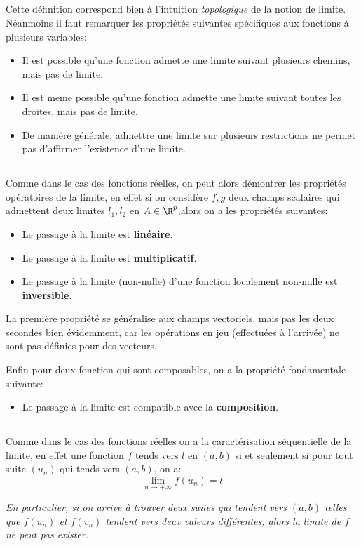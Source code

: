 \subsection*{}
Cette définition correspond bien à l'intuition \textit{topologique} de la notion de limite. Néanmoins il faut remarquer les propriétés suivantes spécifiques aux fonctions à plusieurs variables:
\begin{itemize}
   \item Il est possible qu'une fonction admette une limite suivant plusieurs chemins, mais pas de limite.
   \item Il est meme possible qu'une fonction admette une limite suivant toutes les droites, mais pas de limite.
   \item De manière générale, admettre une limite sur plusieurs restrictions ne permet pas d'affirmer l'existence d'une limite.
\end{itemize}

\subsection*{}
Comme dans le cas des fonctions réelles, on peut alors démontrer les propriétés opératoires de la limite, en effet si on considère \(f, g\) deux champs scalaires qui admettent deux limites \(l_1, l_2\) en \(A \in \R^p\),alors on a les propriétés suivantes:
\begin{itemize}
   \item Le passage à la limite est \textbf{linéaire}.
   \item Le passage à la limite est \textbf{multiplicatif}.
   \item Le passage à la limite (non-nulle) d'une fonction localement non-nulle est \textbf{inversible}.
\end{itemize}
La première propriété se généralise aux champs vectoriels, mais pas les deux secondes bien évidemment, car les opérations en jeu (effectuées à l'arrivée) ne sont pas définies pour des vecteurs.\<

Enfin pour deux fonction qui sont composables, on a la propriété fondamentale suivante:
\begin{itemize}
   \item Le passage à la limite est compatible avec la \textbf{composition}.
\end{itemize}

\subsection*{}
Comme dans le cas des fonctions réelles on a la caractérisation séquentielle de la limite, en effet une fonction \(f\) tends vers \(l\) en \((a, b)\) si et seulement si pour tout suite \((u_n)\) qui tends vers \((a, b)\), on a:
\[
   \lim_{n \rightarrow +\infty} f(u_n) = l
\]
\begin{center}
   \textit{En particulier, si on arrive à trouver deux suites qui tendent vers \((a, b)\) telles que \(f(u_n)\) et \(f(v_n)\) tendent vers deux valeurs différentes, alors la limite de \(f\) ne peut pas exister.}
\end{center}

